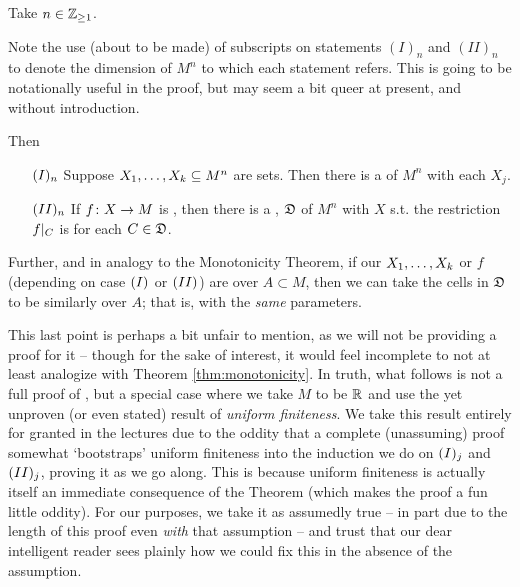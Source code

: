 \begin{theorem}[\CD]
  \label{thm:cell-decomposition}
  Take $n \in \Zgeq{1}$.
  \begin{svgraybox}
    Note the use (about to be made) of subscripts on statements $(I)_n$ and $(II)_n$ to denote the dimension of $M^n$ to which each statement refers. This is going to be notationally useful in the proof, but may seem a bit queer at present, and without introduction.
  \end{svgraybox}
 Then
  \begin{enumerate}[label={}]
    \item[$\In$ ] Suppose $\vonevm{X}{k} \subseteq M^n$ are  sets. Then there is a \cd of $M^n$ \cmptble with each $X_j$.
    \item[$\IIn$ ] If $\funcdom{f}{X}{M}$ is , then there is a \cd, $\fancyD$ of $M^n$ \cmptble with $X$ s.t. the restriction $\funcrestr{f}{C}$ is \cont for each $C \in \fancyD$.
  \end{enumerate}

  Further, and in analogy to the Monotonicity Theorem, if our $\vonevm{X}{k}$ or $f$ (depending on case $\In[]$ or $\IIn[]$) are  over $A \subset M$, then we can take the cells in  $\fancyD$ to be similarly  over $A$; that is, with the \emph{same} parameters.

  \begin{svgraybox}
    This last point is perhaps a bit unfair to mention, as we will not be providing a proof for it -- though for the sake of interest, it would feel incomplete to not at least analogize with Theorem \ref{thm:monotonicity}. In truth, what follows is not a full proof of \CD, but a special case where we take $M$ to be $\R$ and use the yet unproven (or even stated) result of \emph{uniform finiteness}. We take this result entirely for granted in the lectures due to the oddity that a complete (unassuming) proof somewhat `bootstraps' uniform finiteness into the induction we do on $\In[j]$ and $\IIn[j]$, proving it as we go along. This is because uniform finiteness is actually itself an immediate consequence of the \CD Theorem (which makes the proof a fun little oddity). For our purposes, we take it as assumedly true -- in part due to the length of this proof even \emph{with} that assumption -- and trust that our dear intelligent reader sees plainly how we could fix this in the absence of the assumption.
  \end{svgraybox}

\end{theorem}

